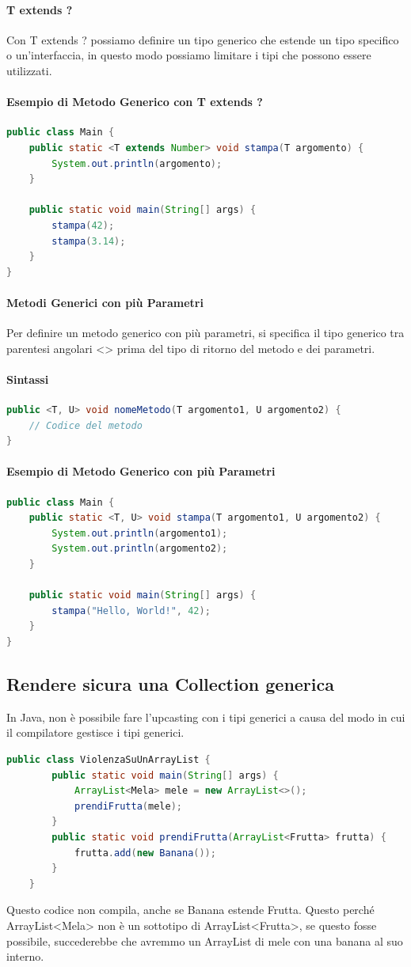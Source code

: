 \documentclass[11pt]{article}
\begin{document}
\paragraph{T extends ?}
Con T extends ? possiamo definire un tipo generico che estende un tipo specifico o un'interfaccia, in questo modo possiamo limitare i tipi che possono essere utilizzati.
\paragraph{Esempio di Metodo Generico con T extends ?}
\begin{lstlisting}[language=Java]
public class Main {
    public static <T extends Number> void stampa(T argomento) {
        System.out.println(argomento);
    }

    public static void main(String[] args) {
        stampa(42);
        stampa(3.14);
    }
}
\end{lstlisting}
\paragraph{Metodi Generici con più Parametri}
Per definire un metodo generico con più parametri, si specifica il tipo generico tra parentesi angolari <> prima del tipo di ritorno del metodo e dei parametri.
\paragraph{Sintassi}
\begin{lstlisting}[language=Java]
public <T, U> void nomeMetodo(T argomento1, U argomento2) {
    // Codice del metodo
}
\end{lstlisting}
\paragraph{Esempio di Metodo Generico con più Parametri}
\begin{lstlisting}[language=Java]
public class Main {
    public static <T, U> void stampa(T argomento1, U argomento2) {
        System.out.println(argomento1);
        System.out.println(argomento2);
    }

    public static void main(String[] args) {
        stampa("Hello, World!", 42);
    }
}
\end{lstlisting}
\subsection{Rendere sicura una Collection generica}
In Java, non è possibile fare l'upcasting con i tipi generici a causa del modo in cui il compilatore gestisce i tipi generici.
\begin{lstlisting}[language=Java]
    public class ViolenzaSuUnArrayList {
        public static void main(String[] args) {
            ArrayList<Mela> mele = new ArrayList<>();
            prendiFrutta(mele);
        }
        public static void prendiFrutta(ArrayList<Frutta> frutta) {
            frutta.add(new Banana());
        }
    }
    \end{lstlisting}
Questo codice non compila, anche se Banana estende Frutta. Questo perché ArrayList<Mela> non è un sottotipo di ArrayList<Frutta>,
se questo fosse possibile, succederebbe che avremmo un ArrayList di mele con una banana al suo interno.
\end{document}
